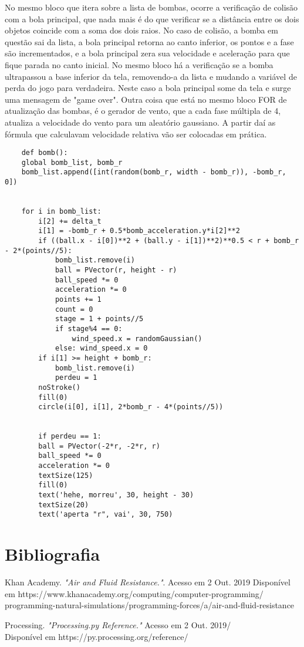 \documentclass[12pt,letterpaper]{article}
\begin{document}
No mesmo bloco que itera sobre a lista de bombas, ocorre a verificação de colisão com a bola principal, que nada mais é do que verificar se a distância entre os dois objetos coincide com a soma dos dois raios. No caso de colisão, a bomba em questão sai da lista, a bola principal retorna ao canto inferior, os pontos e a fase são incrementados, e a bola principal zera sua velocidade e aceleração para que fique parada no canto inicial. No mesmo bloco há a verificação se a bomba ultrapassou a base inferior da tela, removendo-a da lista e mudando a variável de perda do jogo para verdadeira. Neste caso a bola principal some da tela e surge uma mensagem de "game over". Outra coisa que está no mesmo bloco FOR de atualização das bombas, é o gerador de vento, que a cada fase múltipla de 4, atualiza a velocidade do vento para um aleatório gaussiano. A partir daí as fórmula que calculavam velocidade relativa vão ser colocadas em prática.

\begin{lstlisting}
    def bomb():
    global bomb_list, bomb_r
    bomb_list.append([int(random(bomb_r, width - bomb_r)), -bomb_r, 0])
    
    
    for i in bomb_list:
        i[2] += delta_t
        i[1] = -bomb_r + 0.5*bomb_acceleration.y*i[2]**2
        if ((ball.x - i[0])**2 + (ball.y - i[1])**2)**0.5 < r + bomb_r - 2*(points//5):
            bomb_list.remove(i)
            ball = PVector(r, height - r)
            ball_speed *= 0
            acceleration *= 0
            points += 1
            count = 0
            stage = 1 + points//5
            if stage%4 == 0:
                wind_speed.x = randomGaussian()
            else: wind_speed.x = 0
        if i[1] >= height + bomb_r:
            bomb_list.remove(i)
            perdeu = 1
        noStroke()
        fill(0)
        circle(i[0], i[1], 2*bomb_r - 4*(points//5))
        
        
        if perdeu == 1:
        ball = PVector(-2*r, -2*r, r)
        ball_speed *= 0
        acceleration *= 0
        textSize(125)
        fill(0)
        text('hehe, morreu', 30, height - 30)
        textSize(20)
        text('aperta "r", vai', 30, 750)
\end{lstlisting}



\newpage
\section*{Bibliografia}

Khan Academy. \textit{"Air and Fluid Resistance."}. Acesso em 2 Out. 2019
Disponível em https://www.khanacademy.org/computing/computer-programming/ \\
programming-natural-simulations/programming-forces/a/air-and-fluid-resistance

Processing. \textit{"Processing.py Reference."} Acesso em 2 Out. 2019/\\
Disponível em https://py.processing.org/reference/
\end{document}
